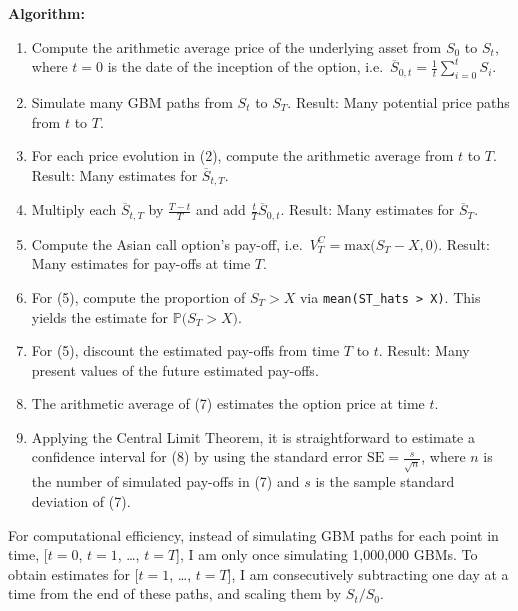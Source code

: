 \documentclass[
  12pt,
]{article}
\providecommand{\tightlist}{%
  \setlength{\itemsep}{0pt}\setlength{\parskip}{0pt}}
\begin{document}
\normalsize

\vspace{2mm}

\textbf{Algorithm:}

\begin{enumerate}
\def\labelenumi{\arabic{enumi}.}
\tightlist
\item
  Compute the arithmetic average price of the underlying asset from
  \(S_0\) to \(S_t\), where \(t=0\) is the date of the inception of the
  option, i.e.~\(\overline{S}_{0,t}= \frac{1}{t} \sum^{t}_{i = 0} S_i\).
\item
  Simulate many GBM paths from \(S_t\) to \(S_T\). Result: Many
  potential price paths from \(t\) to \(T\).
\item
  For each price evolution in (2), compute the arithmetic average from
  \(t\) to \(T\). Result: Many estimates for \(\overline{S}_{t,T}\).
\item
  Multiply each \(\overline {S}_{t,T}\) by \(\frac{T-t}{T}\) and add
  \(\frac{t}{T} \overline S_{0,t}\). Result: Many estimates for
  \(\overline{S}_T\).
\item
  Compute the Asian call option's pay-off,
  i.e.~\(V^C_T = \text{max} \big({S}_T - X,0 \big)\). Result: Many
  estimates for pay-offs at time \(T\).
\item
  For (5), compute the proportion of \({S}_T > X\) via
  \texttt{mean(ST\_hats\ \textgreater{}\ X)}. This yields the estimate
  for \(\mathbb P\big({S}_T > X \big)\).
\item
  For (5), discount the estimated pay-offs from time \(T\) to \(t\).
  Result: Many present values of the future estimated pay-offs.
\item
  The arithmetic average of (7) estimates the option price at time
  \(t\).
\item
  Applying the Central Limit Theorem, it is straightforward to estimate
  a confidence interval for (8) by using the standard error
  \(\text{SE}=\frac{s}{\sqrt{n}}\), where \(n\) is the number of
  simulated pay-offs in (7) and \(s\) is the sample standard deviation
  of (7).
\end{enumerate}

For computational efficiency, instead of simulating GBM paths for each
point in time, {[}\(t=0\), \(t=1\), \ldots, \(t=T\){]}, I am only once
simulating 1,000,000 GBMs. To obtain estimates for {[}\(t=1\), \ldots,
\(t=T\){]}, I am consecutively subtracting one day at a time from the
end of these paths, and scaling them by \(S_t/S_0\).
\end{document}
